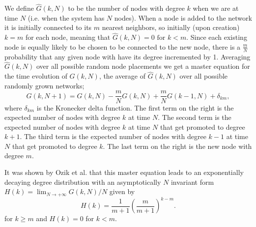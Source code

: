 \documentclass[aps,pre,reprint,superscriptaddress,amsmath,amssymb,nofootinbib]{revtex4-1}
\begin{document}
We define $\hat{G}(k,N)$ to be the number of nodes with degree $k$ when we are at time $N$ (i.e. when the system has $N$ nodes).
When a node is added to the network it is initially connected to its $m$ nearest neighbors, so initially (upon creation) $k = m$ for each node, meaning that $\hat{G}(k,N) = 0 \text{ for } k < m$.
Since each existing node is equally likely to be chosen to be connected to the new node, there is a $\frac{m}{N}$ probability that any given node with have its degree incremented by 1.
Averaging $\hat{G}(k,N)$ over all possible random node placements we get a master equation for the time evolution of $G(k,N)$, the average of $\hat{G}(k,N)$ over all possible randomly grown networks;
\begin{equation}
G(k,N+1) = G(k,N) - \frac{m}{N}G(k,N) + \frac{m}{N}G(k-1,N) + \delta_{km},
\end{equation}
\noindent where $\delta_{km}$ is the Kronecker delta function.
The first term on the right is the expected number of nodes with degree $k$ at time $N$.
The second term is the expected number of nodes with degree $k$ at time $N$ that get promoted to degree $k+1$.
The third term is the expected number of nodes with degree $k-1$ at time $N$ that get promoted to degree $k$.
The last term on the right is the new node with degree $m$.

It was shown by Ozik et al. \cite{ozik2004} that this master equation leads to an exponentially decaying degree distribution with an asymptotically $N$ invariant form $H(k) = \lim_{N \to +\infty} G(k,N)/N$ given by
\begin{equation}\label{degeq}
H(k) = \frac{1}{m+1}\left(\frac{m}{m+1}\right)^{k-m}.
\end{equation}
\noindent for $k \geq m$ and $H(k) = 0$ for $k < m$.
\end{document}
